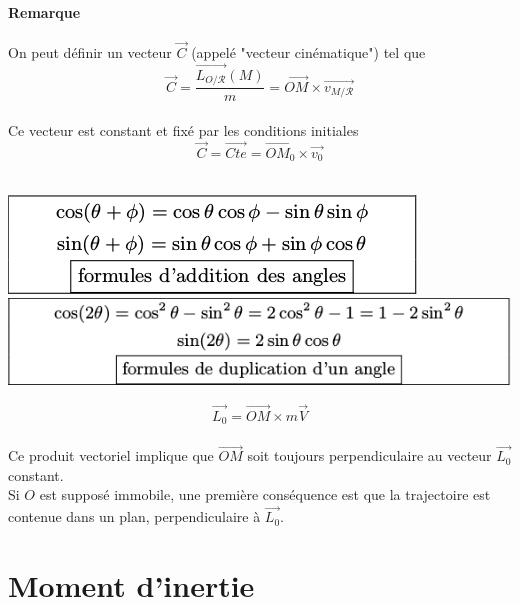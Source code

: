 \documentclass[a4paper,10pt]{book} %
\begin{document}
\subsubsection{Remarque}
On peut définir un vecteur $\overrightarrow{C}$ (appelé "vecteur cinématique") tel que $$\overrightarrow{C}=\frac{\overrightarrow{L_{O/\mathcal{R}}}(M)}{m}= \overrightarrow{OM}\times \overrightarrow{v_{M/\mathcal{R}}}$$\\
Ce vecteur est constant et fixé par les conditions initiales $$\overrightarrow{C}=\overrightarrow{Cte}=\overrightarrow{OM_0}\times \overrightarrow{v_0}$$\\

\begin{center}\hfill\includegraphics[scale=0.4]{images/011.png}\hfill
\includegraphics[scale=0.4]{images/012.png}\hfill\end{center}\bigskip\bigskip
$$\overrightarrow{L_0}=\overrightarrow{OM}\times m\overrightarrow{V}$$\\
Ce produit vectoriel implique que $\overrightarrow{OM}$ soit toujours perpendiculaire au vecteur $\overrightarrow{L_0}$ constant.\\
Si $O$ est supposé immobile, une première conséquence est que la trajectoire est contenue dans un plan, perpendiculaire à $\overrightarrow{L_0}$.







\chapter{Moment d'inertie}
\end{document}
